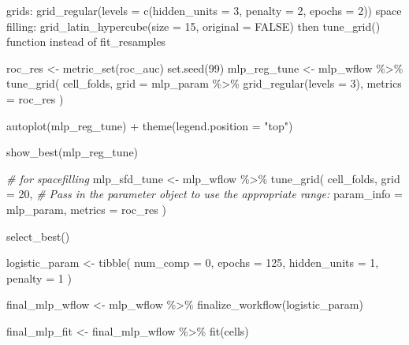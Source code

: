 \documentclass[
]{book}
\newenvironment{Shaded}{\begin{snugshade}}{\end{snugshade}}
\newcommand{\AttributeTok}[1]{\textcolor[rgb]{0.77,0.63,0.00}{#1}}
\newcommand{\CommentTok}[1]{\textcolor[rgb]{0.56,0.35,0.01}{\textit{#1}}}
\newcommand{\DecValTok}[1]{\textcolor[rgb]{0.00,0.00,0.81}{#1}}
\newcommand{\FunctionTok}[1]{\textcolor[rgb]{0.00,0.00,0.00}{#1}}
\newcommand{\NormalTok}[1]{#1}
\newcommand{\OtherTok}[1]{\textcolor[rgb]{0.56,0.35,0.01}{#1}}
\newcommand{\SpecialCharTok}[1]{\textcolor[rgb]{0.00,0.00,0.00}{#1}}
\newcommand{\StringTok}[1]{\textcolor[rgb]{0.31,0.60,0.02}{#1}}
\begin{document}
grids: grid\_regular(levels = c(hidden\_units = 3, penalty = 2, epochs = 2)) space filling: grid\_latin\_hypercube(size = 15, original = FALSE) then tune\_grid() function instead of fit\_resamples

\begin{Shaded}
\begin{Highlighting}[]
\NormalTok{roc\_res }\OtherTok{\textless{}{-}} \FunctionTok{metric\_set}\NormalTok{(roc\_auc)}
\FunctionTok{set.seed}\NormalTok{(}\DecValTok{99}\NormalTok{)}
\NormalTok{mlp\_reg\_tune }\OtherTok{\textless{}{-}}
\NormalTok{  mlp\_wflow }\SpecialCharTok{\%\textgreater{}\%}
  \FunctionTok{tune\_grid}\NormalTok{(}
\NormalTok{    cell\_folds,}
    \AttributeTok{grid =}\NormalTok{ mlp\_param }\SpecialCharTok{\%\textgreater{}\%} \FunctionTok{grid\_regular}\NormalTok{(}\AttributeTok{levels =} \DecValTok{3}\NormalTok{),}
    \AttributeTok{metrics =}\NormalTok{ roc\_res}
\NormalTok{  )}

\FunctionTok{autoplot}\NormalTok{(mlp\_reg\_tune) }\SpecialCharTok{+} \FunctionTok{theme}\NormalTok{(}\AttributeTok{legend.position =} \StringTok{"top"}\NormalTok{)}

\FunctionTok{show\_best}\NormalTok{(mlp\_reg\_tune)}

\CommentTok{\# for spacefilling}
\NormalTok{mlp\_sfd\_tune }\OtherTok{\textless{}{-}}
\NormalTok{  mlp\_wflow }\SpecialCharTok{\%\textgreater{}\%}
  \FunctionTok{tune\_grid}\NormalTok{(}
\NormalTok{    cell\_folds,}
    \AttributeTok{grid =} \DecValTok{20}\NormalTok{,}
    \CommentTok{\# Pass in the parameter object to use the appropriate range: }
    \AttributeTok{param\_info =}\NormalTok{ mlp\_param,}
    \AttributeTok{metrics =}\NormalTok{ roc\_res}
\NormalTok{  )}

\FunctionTok{select\_best}\NormalTok{()}
\end{Highlighting}
\end{Shaded}

\begin{Shaded}
\begin{Highlighting}[]
\NormalTok{logistic\_param }\OtherTok{\textless{}{-}} 
  \FunctionTok{tibble}\NormalTok{(}
    \AttributeTok{num\_comp =} \DecValTok{0}\NormalTok{,}
    \AttributeTok{epochs =} \DecValTok{125}\NormalTok{,}
    \AttributeTok{hidden\_units =} \DecValTok{1}\NormalTok{,}
    \AttributeTok{penalty =} \DecValTok{1}
\NormalTok{  )}

\NormalTok{final\_mlp\_wflow }\OtherTok{\textless{}{-}} 
\NormalTok{  mlp\_wflow }\SpecialCharTok{\%\textgreater{}\%} 
  \FunctionTok{finalize\_workflow}\NormalTok{(logistic\_param)}

\NormalTok{final\_mlp\_fit }\OtherTok{\textless{}{-}} 
\NormalTok{  final\_mlp\_wflow }\SpecialCharTok{\%\textgreater{}\%} 
  \FunctionTok{fit}\NormalTok{(cells)}
\end{Highlighting}
\end{Shaded}
\end{document}
